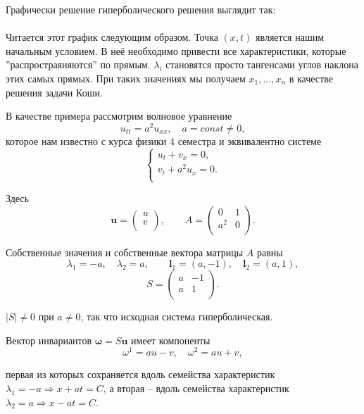 \documentclass[../main.tex]{subfile}
\begin{document}
Графически решение гиперболического решения выглядит так: \\

 \\

Читается этот график следующим образом. Точка $(x,t)$ является нашим начальным
условием. В неё необходимо привести все характеристики, которые
''распростраяняются'' по прямым. $\lambda_i$ становятся просто тангенсами
углов наклона этих самых прямых. При таких значениях мы получаем $x_1,...,x_n$
в качестве решения задачи Коши.

\begin{example}\label{eq:wave_equation_example}
	В качестве примера рассмотрим волновое уравнение
	\[u_{tt}=a^2u_{xx},\quad a=const\ne 0,\]
	которое нам известно с курса физики 4 семестра и эквивалентно
	системе
	\[\begin{cases}
		u_t+v_x=0, \\
		v_t+a^2u_x=0. \\
	\end{cases}\]

	Здесь
	\[\boldsymbol{u}=
		\begin{pmatrix}
			u \\
			v \\
		\end{pmatrix},
	\qquad
	A=
		\begin{pmatrix}
			0 & 1 \\
			a^2 & 0 \\
		\end{pmatrix}.
	\]

	Собственные значения и собственные вектора матрицы $A$ равны
	\[\lambda_1=-a,\quad \lambda_2=a,\qquad
	\boldsymbol{l}_1=(a,-1),\quad \boldsymbol{l}_2=(a,1),\]
	\[
		S=
		\begin{pmatrix}
			a & -1 \\
			a & 1  \\
		\end{pmatrix}.
	\]

	$|S|\ne 0$ при $a\ne 0$, так что исходная система гиперболическая.

	Вектор инвариантов $\boldsymbol{\omega}=S\boldsymbol{u}$ имеет
	компоненты
	\[\omega^1=au-v,\quad \omega^2=au+v,\]

	первая из которых сохраняется вдоль семейства характеристик
	$\lambda_1=-a\Rightarrow x+at=C$, а вторая -- вдоль семейства
	характеристик $\lambda_2=a\Rightarrow x-at=C$. \\


\end{example}
\end{document}
